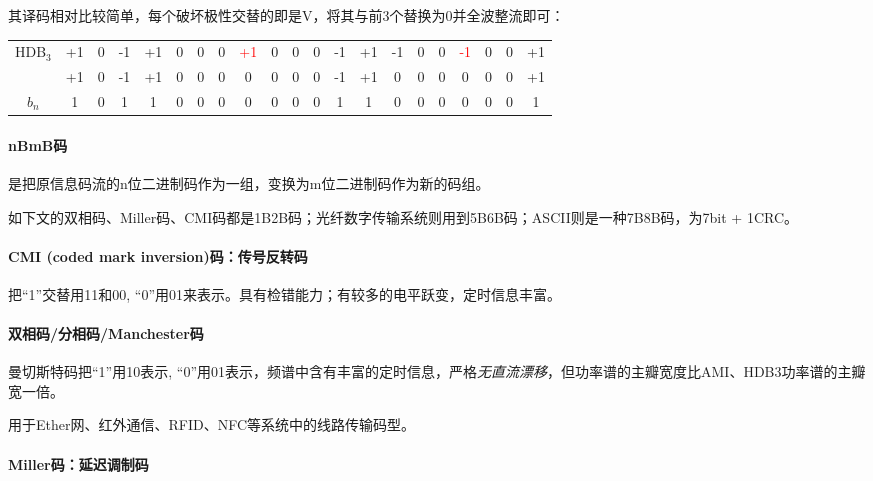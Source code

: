    其译码相对比较简单，每个破坏极性交替的即是V，将其与前3个替换为0并全波整流即可：
    \begin{table}[H]
        \centering
        \begin{tabular}{c|*{19}{c}c}
            \textcolor{bupt}{HDB${}_3$\hspace{-2pt}} &+1 &0 &-1 &+1 &0 &0 &0 &\textcolor{red}{+1} &0 &0 &0 &-1 &+1 &-1 &0 &0 &\textcolor{red}{-1} &0 &0 &+1 \\ \Xhline{0.3pt}
            {}&+1 &0 &-1 &+1 &\textcolor{pur}{0} &\textcolor{pur}{0} &\textcolor{pur}{0} &\textcolor{pur}{0} &0 &0 &0 &-1 &+1 &\textcolor{pur}{0} &\textcolor{pur}{0} &\textcolor{pur}{0} &\textcolor{pur}{0} &0 &0 &+1 \\ \Xhline{0.3pt}
            \textcolor{bupt}{$b_n$\hspace{-2pt}} &1 &0 &1 &1 &0 &0 &0 &0 &0 &0 &0 &1 &1 &0 &0 &0 &0 &0 &0 &1
        \end{tabular}
    \end{table}

    \paragraph{nBmB码}\mbox{}

    是把原信息码流的n位二进制码作为一组，变换为m位二进制码作为新的码组。

    如下文的双相码、Miller码、CMI码都是1B2B码；光纤数字传输系统则用到5B6B码；ASCII则是一种7B8B码，为7bit + 1CRC。

    \paragraph{CMI (coded mark inversion)码：传号反转码}\mbox{}

    把“1”交替用11和00, “0”用01来表示。具有检错能力；有较多的电平跃变，定时信息丰富。

    \paragraph{双相码/分相码/Manchester码}\mbox{}

    曼切斯特码把“1”用10表示, “0”用01表示，频谱中含有丰富的定时信息，严格\emph{无直流漂移}，但功率谱的主瓣宽度比AMI、HDB3功率谱的主瓣宽一倍。

    用于Ether网、红外通信、RFID、NFC等系统中的线路传输码型。

    \paragraph{Miller码：延迟调制码}\mbox{}

